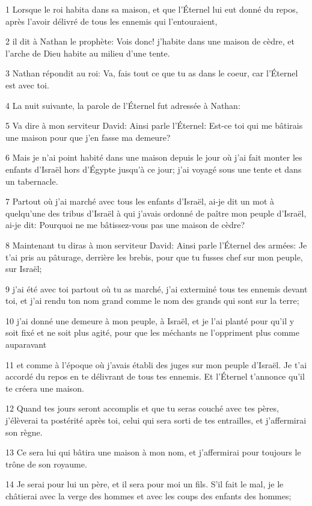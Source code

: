 \par 1 Lorsque le roi habita dans sa maison, et que l'Éternel lui eut donné du repos, après l'avoir délivré de tous les ennemis qui l'entouraient,
\par 2 il dit à Nathan le prophète: Vois donc! j'habite dans une maison de cèdre, et l'arche de Dieu habite au milieu d'une tente.
\par 3 Nathan répondit au roi: Va, fais tout ce que tu as dans le coeur, car l'Éternel est avec toi.
\par 4 La nuit suivante, la parole de l'Éternel fut adressée à Nathan:
\par 5 Va dire à mon serviteur David: Ainsi parle l'Éternel: Est-ce toi qui me bâtirais une maison pour que j'en fasse ma demeure?
\par 6 Mais je n'ai point habité dans une maison depuis le jour où j'ai fait monter les enfants d'Israël hors d'Égypte jusqu'à ce jour; j'ai voyagé sous une tente et dans un tabernacle.
\par 7 Partout où j'ai marché avec tous les enfants d'Israël, ai-je dit un mot à quelqu'une des tribus d'Israël à qui j'avais ordonné de paître mon peuple d'Israël, ai-je dit: Pourquoi ne me bâtissez-vous pas une maison de cèdre?
\par 8 Maintenant tu diras à mon serviteur David: Ainsi parle l'Éternel des armées: Je t'ai pris au pâturage, derrière les brebis, pour que tu fusses chef sur mon peuple, sur Israël;
\par 9 j'ai été avec toi partout où tu as marché, j'ai exterminé tous tes ennemis devant toi, et j'ai rendu ton nom grand comme le nom des grands qui sont sur la terre;
\par 10 j'ai donné une demeure à mon peuple, à Israël, et je l'ai planté pour qu'il y soit fixé et ne soit plus agité, pour que les méchants ne l'oppriment plus comme auparavant
\par 11 et comme à l'époque où j'avais établi des juges sur mon peuple d'Israël. Je t'ai accordé du repos en te délivrant de tous tes ennemis. Et l'Éternel t'annonce qu'il te créera une maison.
\par 12 Quand tes jours seront accomplis et que tu seras couché avec tes pères, j'élèverai ta postérité après toi, celui qui sera sorti de tes entrailles, et j'affermirai son règne.
\par 13 Ce sera lui qui bâtira une maison à mon nom, et j'affermirai pour toujours le trône de son royaume.
\par 14 Je serai pour lui un père, et il sera pour moi un fils. S'il fait le mal, je le châtierai avec la verge des hommes et avec les coups des enfants des hommes;

